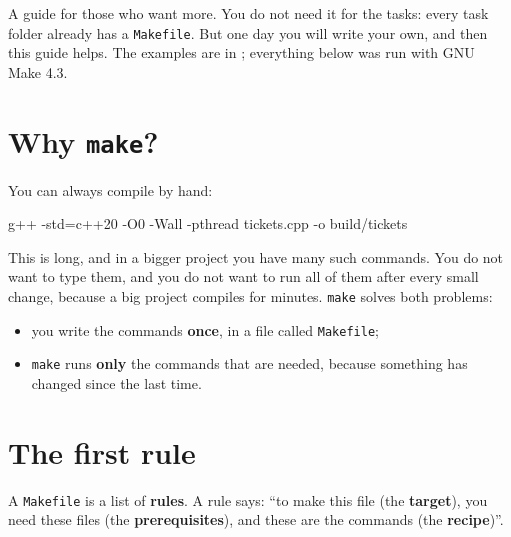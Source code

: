 \documentclass[a4paper,11pt]{article}
\begin{document}

A guide for those who want more. You do not need it for the tasks: every task folder already has a
\texttt{Makefile}. But one day you will write your own, and then this guide helps. The examples are in
; everything below was run with GNU Make 4.3.

\section{Why \texttt{make}?}

You can always compile by hand:

\begin{terminal}
g++ -std=c++20 -O0 -Wall -pthread tickets.cpp -o build/tickets
\end{terminal}

This is long, and in a bigger project you have many such commands. You do not want to type them, and you do not
want to run all of them after every small change, because a big project compiles for minutes. \texttt{make} solves
both problems:

\begin{itemize}
  \item you write the commands \textbf{once}, in a file called \texttt{Makefile};
  \item \texttt{make} runs \textbf{only} the commands that are needed, because something has changed since the last time.
\end{itemize}

\section{The first rule}

A \texttt{Makefile} is a list of \textbf{rules}. A rule says: ``to make this file (the \textbf{target}), you need these
files (the \textbf{prerequisites}), and these are the commands (the \textbf{recipe})''.
\end{document}
